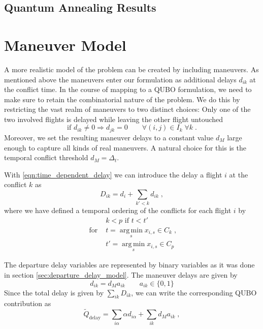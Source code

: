 \documentclass[aps,pra,twocolumn,10pt]{revtex4-1}
\begin{document}
\subsection{Quantum Annealing Results}

\section{Maneuver Model}
A more realistic model of the problem can be created by including maneuvers.
As mentioned above the maneuvers enter our formulation as additional delays $d_{ik}$ at the conflict time.
In the course of mapping to a QUBO formulation, we need to make sure to retain the combinatorial nature of the problem.
We do this by restricting the vast realm of maneuvers to two distinct choices:
Only one of the two involved flights is delayed while leaving the other flight untouched
\begin{equation} \label{eqn:maneuver_model_maneuver_decision}
    \text{if } d_{ik} \neq 0 \Rightarrow d_{jk} = 0  \qquad \forall (i, j) \in I_k \; \forall k \; .
\end{equation}
Moreover, we set the resulting maneuver delays to a constant value $d_M$ large enough to capture all kinds of real maneuvers.
A natural choice for this is the temporal conflict threshold $d_M = \Delta_t$.

With \eqref{eqn:time_dependent_delay} we can introduce the delay a flight $i$ at the conflict $k$ as
\begin{equation} \label{eqn:maneuver_model_delay_at_conflict}
    D_{ik} = d_i + \sum_{k'<k} d_{ik} \; ,
\end{equation}
where we have defined a temporal ordering of the conflicts for each flight $i$ by
\begin{align*}
                 &k < p \text{ if } t < t' \\
    \text{ for } &t = \operatorname*{arg\, min}_s x_{i, s} \in C_k \; , \\
                 &t' = \operatorname*{arg\, min}_s x_{i, s} \in C_p
\end{align*}

The departure delay variables are represented by binary variables as it was done in section \ref{sec:departure_delay_model}.
The maneuver delays are given by
\begin{equation*}
    d_{ik} = d_M a_{ik} \qquad a_{ik} \in \{0, 1\}
\end{equation*}
Since the total delay is given by $\sum_{ik} D_{ik}$, we can write the corresponding QUBO contribution as
\begin{equation*}
    \tilde Q_\text{delay} = \sum_{i\alpha} \alpha d_{i\alpha}  + \sum_{ik} d_M a_{ik}\; ,
\end{equation*}
\end{document}
